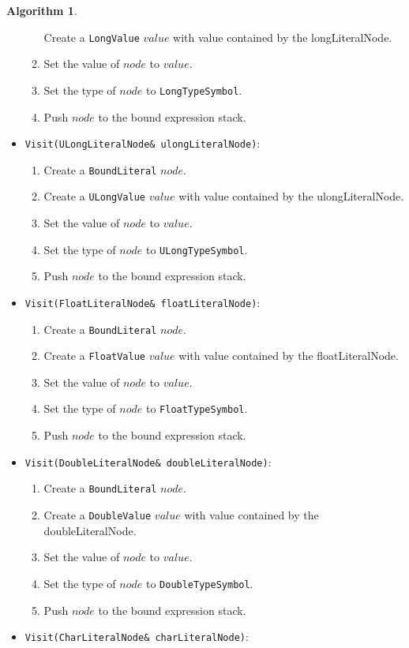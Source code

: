 \documentclass[a4paper,oneside,11pt]{book}
\theoremstyle{definition}
\newtheorem{algo}{Algorithm}[section]
\begin{document}
\begin{algo}
\begin{itemize}
\begin{enumerate}
Create a \verb|LongValue| $value$ with value contained by the longLiteralNode.
\item
Set the value of $node$ to $value$.
\item
Set the type of $node$ to \verb|LongTypeSymbol|.
\item
Push $node$ to the bound expression stack.
\end{enumerate}
\item
\verb|Visit(ULongLiteralNode& ulongLiteralNode)|:
\begin{enumerate}
\item
Create a \verb|BoundLiteral| $node$.
\item
Create a \verb|ULongValue| $value$ with value contained by the ulongLiteralNode.
\item
Set the value of $node$ to $value$.
\item
Set the type of $node$ to \verb|ULongTypeSymbol|.
\item
Push $node$ to the bound expression stack.
\end{enumerate}
\item
\verb|Visit(FloatLiteralNode& floatLiteralNode)|:
\begin{enumerate}
\item
Create a \verb|BoundLiteral| $node$.
\item
Create a \verb|FloatValue| $value$ with value contained by the floatLiteralNode.
\item
Set the value of $node$ to $value$.
\item
Set the type of $node$ to \verb|FloatTypeSymbol|.
\item
Push $node$ to the bound expression stack.
\end{enumerate}
\item
\verb|Visit(DoubleLiteralNode& doubleLiteralNode)|:
\begin{enumerate}
\item
Create a \verb|BoundLiteral| $node$.
\item
Create a \verb|DoubleValue| $value$ with value contained by the doubleLiteralNode.
\item
Set the value of $node$ to $value$.
\item
Set the type of $node$ to \verb|DoubleTypeSymbol|.
\item
Push $node$ to the bound expression stack.
\end{enumerate}
\item
\verb|Visit(CharLiteralNode& charLiteralNode)|:
\begin{enumerate}

\end{enumerate}
\end{itemize}
\end{algo}
\end{document}
